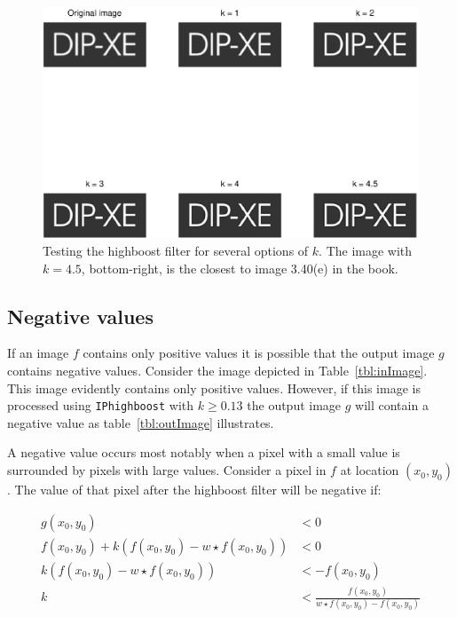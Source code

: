\begin{figure}[h]
 \centering
 \includegraphics{dipxe.eps}
 \caption{Testing the highboost filter for several options of $k$. The image with $k = 4.5$, bottom-right, is the closest to image 3.40(e) in the book.}
 \label{fig:dipxe}
\end{figure}

\subsection{Negative values}
If an image \(f\) contains only positive values it is possible that the output image \(g\) contains negative values.
Consider the image depicted in Table~\ref{tbl:inImage}.
This image evidently contains only positive values.
However, if this image is processed using \texttt{IPhighboost} with \(k \geq 0.13\) the output image \(g\) will contain a negative value as table~\ref{tbl:outImage} illustrates.

A negative value occurs most notably when a pixel with a small value is surrounded by pixels with large values.
Consider a pixel in \(f\) at location \(( x_0, y_0 )\).
The value of that pixel after the highboost filter will be negative if:

\begin{equation} \label{zero_pixel}
  \begin{split}
    g(x_0, y_0) &< 0 \\
    f(x_0, y_0) +  k(f(x_0, y_0) - w \star f(x_0, y_0)) &< 0 \\
    k(f(x_0, y_0) - w \star f(x_0, y_0)) &< -f(x_0, y_0) \\
    k &< \frac{f(x_0, y_0)}{w \star f(x_0, y_0) - f(x_0, y_0)}
  \end{split}
\end{equation}

